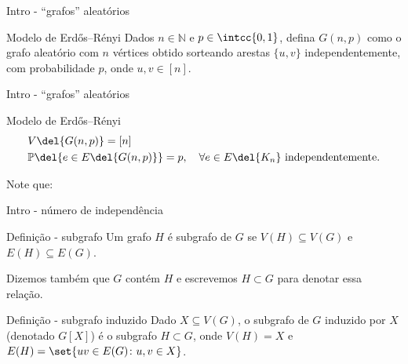 \documentclass{beamer}
\begin{document}
    \begin{frame}{Intro - ``grafos'' aleatórios}
        \begin{block}{Modelo de Erdős--Rényi}
            Dados $ n\in\mathbb{N} $ e $ p\in\intcc{0,1} $, defina $ G(n,p) $ como o
            grafo aleatório com $n$ vértices obtido sorteando arestas $ \{u,v\} $
            independentemente, com probabilidade $ p $, onde $ u,v\in[n] $.
        \end{block}
    \end{frame}

    \begin{frame}{Intro - ``grafos'' aleatórios}
        \begin{block}{Modelo de Erdős--Rényi}
            \vspace{-0.3cm}
            \begin{align*}
                &V\del{G(n,p)}=[n]\\
                &\mathbb{P}\del{e\in E\del{G(n,p)}}=p,\quad \forall e \in
                E\del{K_n}\text{ independentemente.}
            \end{align*}
        \end{block} \pause

        \begin{alertblock}{Note que:}

        \end{alertblock}
    \end{frame}

    \begin{frame}{Intro - número de independência}
        \begin{block}{Definição - subgrafo}
            Um grafo $H$ é subgrafo de $G$ se $V(H)\subseteq V(G)$ e
            $E(H)\subseteq E(G)$.

            Dizemos também que $G$ contém $H$ e escrevemos $H\subset G$ para
            denotar essa relação.
        \end{block}

        \pause

        \begin{block}{Definição - subgrafo induzido}
            Dado $X \subseteq V(G)$, o subgrafo de $G$ induzido por $X$ (denotado $G[X]$)
            é o subgrafo $H\subset G$, onde $V(H)=X$ e $E(H)=\set{uv\in
            E(G)\colon u, v \in X}$.

        \end{block}

    \end{frame}
\end{document}
